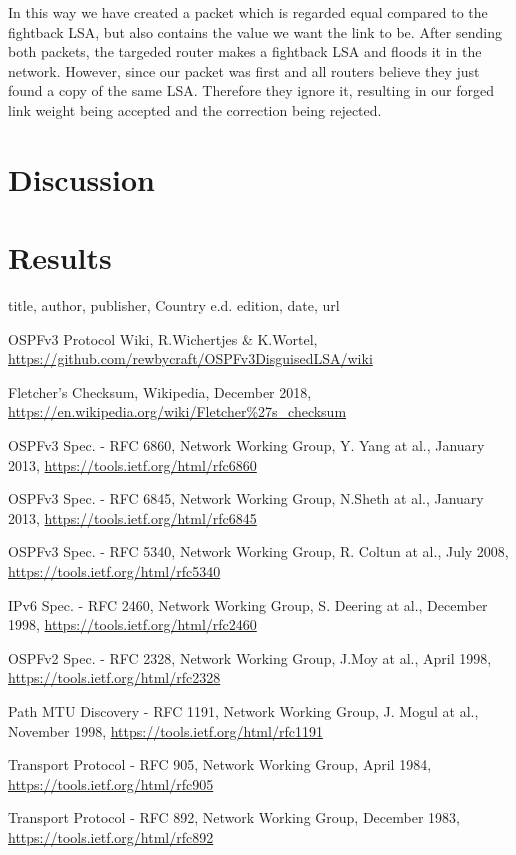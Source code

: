 \documentclass[11pt,a4paper,oneside]{article}
\newcommand{\lsection}[2]{\section{#1}\label{sec:#2}}
\begin{document}
    In this way we have created a packet which is regarded equal compared to the fightback LSA, but also contains the value we want the link to be. After sending both packets, the targeded router makes a fightback LSA and floods it in the network. However, since our packet was first and all routers believe they just found a copy of the same LSA. Therefore they ignore it, resulting in our forged link weight being accepted and the correction being rejected.

    \lsection{Discussion}{discussion}



    \lsection{Results}{results}



    \begin{thebibliography}{999}
        title,
        author,
        publisher,
        Country e.d.
        edition,
        date,
        url

        OSPFv3 Protocol Wiki,
        R.Wichertjes \& K.Wortel,
        \url{https://github.com/rewbycraft/OSPFv3DisguisedLSA/wiki}

        Fletcher's Checksum,
        Wikipedia,
        December 2018,
        \url{https://en.wikipedia.org/wiki/Fletcher\%27s_checksum}


        OSPFv3 Spec. - RFC 6860,
        Network Working Group,
        Y. Yang at al.,
        January 2013,
        \url{https://tools.ietf.org/html/rfc6860}

        OSPFv3 Spec. - RFC 6845,
        Network Working Group,
        N.Sheth at al.,
        January 2013,
        \url{https://tools.ietf.org/html/rfc6845}

        OSPFv3 Spec. - RFC 5340,
        Network Working Group,
        R. Coltun at al.,
        July 2008,
        \url{https://tools.ietf.org/html/rfc5340}

        IPv6 Spec. - RFC 2460,
        Network Working Group,
        S. Deering at al.,
        December 1998,
        \url{https://tools.ietf.org/html/rfc2460}

        OSPFv2 Spec. - RFC 2328,
        Network Working Group,
        J.Moy at al.,
        April 1998,
        \url{https://tools.ietf.org/html/rfc2328}

        Path MTU Discovery - RFC 1191,
        Network Working Group,
        J. Mogul at al.,
        November 1998,
        \url{https://tools.ietf.org/html/rfc1191}

        Transport Protocol - RFC 905,
        Network Working Group,
        April 1984,
        \url{https://tools.ietf.org/html/rfc905}

        Transport Protocol - RFC 892,
        Network Working Group,
        December 1983,
        \url{https://tools.ietf.org/html/rfc892}

    \end{thebibliography}
\end{document}
